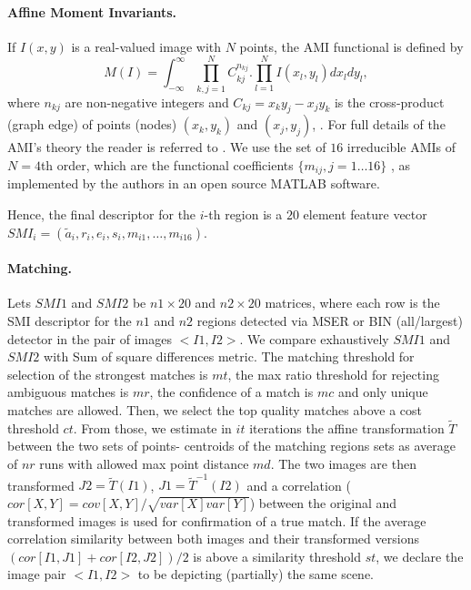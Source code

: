\documentclass[a4paper,11pt]{article}
\begin{document}
\paragraph{Affine Moment Invariants.}
 
If $I(x,y)$ is a real-valued image with $N$ points, the AMI functional is defined by
\begin{equation}
M(I) = \int_{-\infty}^{\infty} \prod_{k,j=1}^{N}C_{kj}^{n_{kj}} . \prod_{l=1}^{N}I(x_l, y_l)dx_ldy_l,
\end{equation}
where $n_{kj}$ are non-negative integers and $C_{kj} =x_ky_j - x_jy_k$ is the cross-product (graph edge) of points (nodes) $(x_k, y_k)$ and $(x_j, y_j)$, \cite{SukF04}. For full details of the AMI's theory the reader is referred to \cite{Flusser09a}.
We use the set of $16$  irreducible AMIs of $N=4$th order, which are the functional coefficients $\{m_{ij},j=1 \ldots 16 \}$ , as implemented by the authors in an open source MATLAB software.%

Hence, the final descriptor for the $i$-th region is a $20$ element feature vector $SMI_i = (\tilde{a}_i, r_i, e_i, s_i, m_{i1}, \ldots, m_{i16})$. 

\paragraph{Matching.}

Lets $\mathit{SMI}1$ and $\mathit{SMI}2$ be $\mathit{n1} \times 20$ and $\mathit{n2} \times 20$ matrices, where each row is the SMI descriptor for the $n1$ and $n2$ regions detected via MSER or BIN (all/largest) detector in the pair of images $<I1, I2>$.
We compare exhaustively  $\mathit{SMI}1$ and $\mathit{SMI}2$ with Sum of square differences metric. The matching threshold for selection of the strongest matches is $\mathit{mt}$, the max ratio threshold for rejecting ambiguous matches is $\mathit{mr}$, the confidence of a match is $\mathit{mc}$ and only unique matches are allowed. Then, we select the top quality matches above a cost threshold $\mathit{ct}$. From those, we estimate in $\mathit{it}$ iterations the affine transformation ${\tilde T}$ between the two sets of points- centroids of the matching regions sets as average of $\mathit{nr}$ runs with allowed max point distance $\mathit{md}$. The two images are then transformed $J2 = {\tilde T}(I1)$, $J1 = {\tilde T}^{-1}(I2)$ and a correlation ($cor[X,Y] = cov[X,Y]/ \sqrt{var[X] var[Y]}$) between the original and transformed images is used for confirmation of a true match. If the average correlation similarity between both images and their transformed versions $(cor[I1, J1]+cor[I2, J2])/2$ is above a similarity threshold $st$, we declare the image pair $<I1, I2>$ to be depicting (partially) the same scene.
\end{document}
